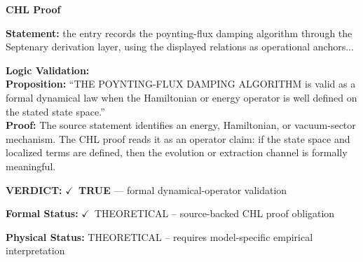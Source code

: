 \vspace{0.45em}
\noindent\textbf{CHL Proof}\par
\textbf{Statement:} the entry records the poynting-flux damping algorithm through the Septenary derivation
layer, using the displayed relations as operational anchors...

\textbf{Logic Validation:}\\
\textbf{Proposition:} ``THE POYNTING-FLUX DAMPING ALGORITHM is valid as a formal dynamical law when the
Hamiltonian or energy operator is well defined on the stated state space.''\\
\textbf{Proof:} The source statement identifies an energy, Hamiltonian, or vacuum-sector mechanism. The
CHL proof reads it as an operator claim: if the state space and localized terms are
defined, then the evolution or extraction channel is formally meaningful.

\textbf{VERDICT:} \ensuremath{\checkmark}\ \textbf{TRUE} --- formal dynamical-operator validation

\textbf{Formal Status:} \ensuremath{\checkmark}\ THEORETICAL -- source-backed CHL proof obligation

\textbf{Physical Status:} THEORETICAL -- requires model-specific empirical interpretation
\par\vspace{0.45em}
\par
\ifTZPDarkEdition
{}
\fi
\endgroup
\endgroup
